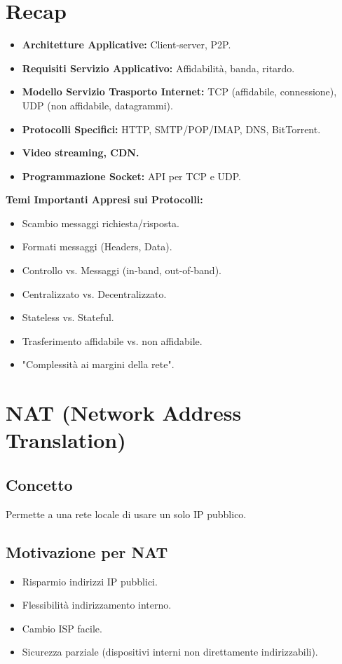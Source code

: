 \section{Recap}
\begin{itemize}
    \item \textbf{Architetture Applicative:} Client-server, P2P.
    \item \textbf{Requisiti Servizio Applicativo:} Affidabilità, banda, ritardo.
    \item \textbf{Modello Servizio Trasporto Internet:} TCP (affidabile, connessione), UDP (non affidabile, datagrammi).
    \item \textbf{Protocolli Specifici:} HTTP, SMTP/POP/IMAP, DNS, BitTorrent.
    \item \textbf{Video streaming, CDN.}
    \item \textbf{Programmazione Socket:} API per TCP e UDP.
\end{itemize}
\textbf{Temi Importanti Appresi sui Protocolli:}
\begin{itemize}
    \item Scambio messaggi richiesta/risposta.
    \item Formati messaggi (Headers, Data).
    \item Controllo vs. Messaggi (in-band, out-of-band).
    \item Centralizzato vs. Decentralizzato.
    \item Stateless vs. Stateful.
    \item Trasferimento affidabile vs. non affidabile.
    \item "Complessità ai margini della rete".
\end{itemize}

\section{NAT (Network Address Translation)}
\subsection{Concetto}
Permette a una rete locale di usare un solo IP pubblico.

\subsection{Motivazione per NAT}
\begin{itemize}
    \item Risparmio indirizzi IP pubblici.
    \item Flessibilità indirizzamento interno.
    \item Cambio ISP facile.
    \item Sicurezza parziale (dispositivi interni non direttamente indirizzabili).
\end{itemize}

